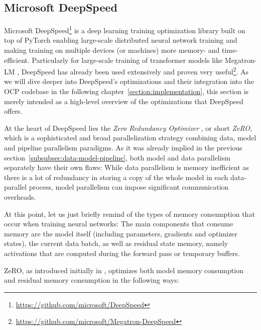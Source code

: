 \subsection{Microsoft DeepSpeed}

Microsoft DeepSpeed\footnote{\url{https://github.com/microsoft/DeepSpeed}} is
a deep learning training optimization library built on top of PyTorch enabling
large-scale distributed neural network training and making training on multiple devices 
(or machines) more memory- and time-efficient. Particularly for large-scale training of
transformer models like Megatron-LM \cite{10.48550/ARXIV.1909.08053}, DeepSpeed has
already been used extensively and proven very 
useful\footnote{\url{https://github.com/microsoft/Megatron-DeepSpeed}}.
As we will dive deeper into DeepSpeed's optimizations and their integration 
into the OCP codebase in the following chapter~\ref{section:implementation}, this 
section is merely intended as a high-level overview of the optimizations that 
DeepSpeed offers.

At the heart of DeepSpeed lies the \textit{Zero Redundancy Optimizer} 
\cite{https://doi.org/10.48550/arxiv.1910.02054,DBLP:journals/corr/abs-2101-06840,DBLP:journals/corr/abs-2104-07857},
or short \textit{ZeRO}, which is a sophisticated and broad parallelization strategy 
combining data, model and pipeline parallelism paradigms.
As it was already implied in the previous section~\ref{subsubsec:data-model-pipeline},
both model and data parallelism separately have their own flaws: While data parallelism
is memory inefficient as there is a lot of redundancy in storing a copy of the whole 
model in each data-parallel process, model parallelism can impose significant communication
overheads. 

At this point, let us just briefly remind of the types of memory consumption 
that occur when training neural networks: The main components that consume memory are the 
model itself (including parameters, gradients and optimizer states), 
the current data batch, as well as residual state memory, namely activations that are 
computed during the forward pass or temporary buffers.

ZeRO, as introduced initially in \cite{https://doi.org/10.48550/arxiv.1910.02054},
optimizes both model memory consumption and residual memory consumption in the
following ways:

